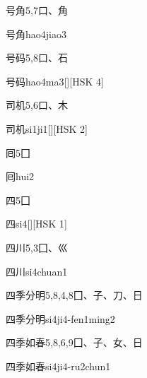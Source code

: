 \begin{entry}{号角}{5,7}{⼝、⾓}
  \begin{phonetics}{号角}{hao4jiao3}
  \end{phonetics}
\end{entry}

\begin{entry}{号码}{5,8}{⼝、⽯}
  \begin{phonetics}{号码}{hao4ma3}[][HSK 4]
  \end{phonetics}
\end{entry}

\begin{entry}{司机}{5,6}{⼝、⽊}
  \begin{phonetics}{司机}{si1ji1}[][HSK 2]
  \end{phonetics}
\end{entry}

\begin{entry}{囘}{5}{⼞}
  \begin{phonetics}{囘}{hui2}
  \end{phonetics}
\end{entry}

\begin{entry}{四}{5}{⼞}
  \begin{phonetics}{四}{si4}[][HSK 1]
  \end{phonetics}
\end{entry}

\begin{entry}{四川}{5,3}{⼞、⼮}
  \begin{phonetics}{四川}{si4chuan1}
  \end{phonetics}
\end{entry}

\begin{entry}{四季分明}{5,8,4,8}{⼞、⼦、⼑、⽇}
  \begin{phonetics}{四季分明}{si4ji4-fen1ming2}
  \end{phonetics}
\end{entry}

\begin{entry}{四季如春}{5,8,6,9}{⼞、⼦、⼥、⽇}
  \begin{phonetics}{四季如春}{si4ji4-ru2chun1}
  \end{phonetics}
\end{entry}

